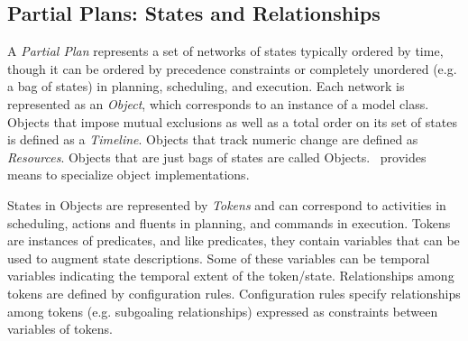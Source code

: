 \documentclass[10pt, letterpaper, twoside]{article}
\begin{document}
\subsection{Partial Plans: States and Relationships}
A {\em Partial Plan} represents a set of networks of states typically
ordered by time, though it can be ordered by precedence constraints or
completely unordered (e.g. a bag of states) in planning, scheduling, and
execution. Each network is represented as an {\em Object}, which
corresponds to an instance of a model class.  Objects that impose
mutual exclusions as well as a total order on its set of states is defined
as a {\em Timeline}. Objects that track numeric change are defined as
{\em Resources}.  Objects that are just bags of states are called
Objects. \ET\, provides means to specialize object implementations.

States in Objects are represented by {\em Tokens} and can correspond to
activities in scheduling, actions and fluents in planning, and commands in
execution. Tokens are instances of predicates, and like predicates, they
contain variables that can be used to augment state descriptions. Some of
these variables can be temporal variables indicating the temporal extent of
the token/state.  Relationships among tokens are defined by configuration
rules.  Configuration rules specify relationships among tokens (e.g.
subgoaling relationships) expressed as constraints between variables of
tokens.
\end{document}
